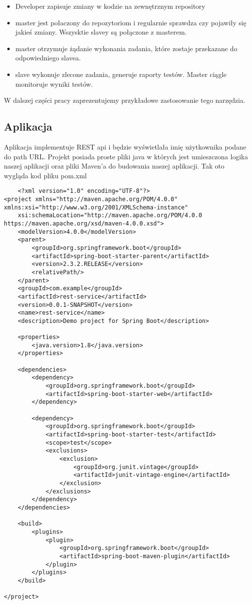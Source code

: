 \begin{itemize}
    \item Developer zapisuje zmiany w kodzie na zewnętrznym repository
    \item master jest połaczony do repozytoriom i regularnie sprawdza czy pojawiły się jakieś zmiany. Wszysktie slavey są połączone z masterem.
    \item master otrzymuje żądanie wykonania zadania, które zostaje przekazane do odpowiedniego slavea. 
    \item slave wykonuje zlecone zadania, generuje raporty testów. Master ciągle monitoruje wyniki testów.
\end{itemize}

W dalszej części pracy zaprezentujemy przykładowe zastosowanie tego narzędzia. 

\subsection{Aplikacja}

Aplikacja implementuje REST api i będzie wyświetlała imię użytkownika podane do path URL. Projekt posiada proste pliki java w których jest umieszczona logika naszej aplikacji oraz pliki Maven'a do budowania naszej aplikacji. Tak oto wygląda kod pliku pom.xml 

\begin{verbatim}
    <?xml version="1.0" encoding="UTF-8"?>
<project xmlns="http://maven.apache.org/POM/4.0.0" xmlns:xsi="http://www.w3.org/2001/XMLSchema-instance"
	xsi:schemaLocation="http://maven.apache.org/POM/4.0.0 https://maven.apache.org/xsd/maven-4.0.0.xsd">
	<modelVersion>4.0.0</modelVersion>
	<parent>
		<groupId>org.springframework.boot</groupId>
		<artifactId>spring-boot-starter-parent</artifactId>
		<version>2.3.2.RELEASE</version>
		<relativePath/>
	</parent>
	<groupId>com.example</groupId>
	<artifactId>rest-service</artifactId>
	<version>0.0.1-SNAPSHOT</version>
	<name>rest-service</name>
	<description>Demo project for Spring Boot</description>

	<properties>
		<java.version>1.8</java.version>
	</properties>

	<dependencies>
		<dependency>
			<groupId>org.springframework.boot</groupId>
			<artifactId>spring-boot-starter-web</artifactId>
		</dependency>

		<dependency>
			<groupId>org.springframework.boot</groupId>
			<artifactId>spring-boot-starter-test</artifactId>
			<scope>test</scope>
			<exclusions>
				<exclusion>
					<groupId>org.junit.vintage</groupId>
					<artifactId>junit-vintage-engine</artifactId>
				</exclusion>
			</exclusions>
		</dependency>
	</dependencies>

	<build>
		<plugins>
			<plugin>
				<groupId>org.springframework.boot</groupId>
				<artifactId>spring-boot-maven-plugin</artifactId>
			</plugin>
		</plugins>
	</build>

</project>

\end{verbatim}

